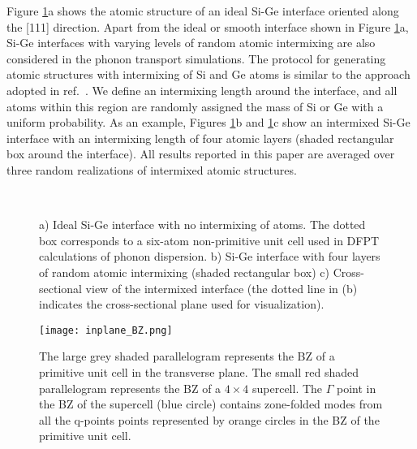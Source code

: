 \documentclass[11pt]{article}
\begin{document}
Figure \ref{Si_Ge_schematic}a shows the atomic structure of an ideal Si-Ge interface oriented along the [111] direction. Apart from the ideal or smooth interface shown in Figure \ref{Si_Ge_schematic}a, Si-Ge interfaces with varying levels of random atomic intermixing are also considered in the phonon transport simulations. The protocol for generating atomic structures with intermixing of Si and Ge atoms is similar to the approach adopted in ref.~\cite{tian2012enhancing}. We define an intermixing length around the interface, and all atoms within this region are randomly assigned the mass of Si or Ge with a uniform probability. As an example, Figures \ref{Si_Ge_schematic}b and \ref{Si_Ge_schematic}c show an intermixed Si-Ge interface with an intermixing length of four atomic layers (shaded rectangular box around the interface). All results reported in this paper are averaged over three random realizations of intermixed atomic structures. 
\begin{figure}
\centering
{}\\
\qquad\quad
{}
\caption{a) Ideal Si-Ge interface with no intermixing of atoms. The dotted box corresponds to a six-atom non-primitive unit cell used in DFPT calculations of phonon dispersion. b) Si-Ge interface with four layers of random atomic intermixing (shaded rectangular box) c) Cross-sectional view of the intermixed interface (the dotted line in (b) indicates the cross-sectional plane used for visualization).}\label{Si_Ge_schematic}
\end{figure}
\begin{figure}
\begin{center}
\texttt{[image: inplane\_BZ.png]}
\caption{The large grey shaded parallelogram represents the BZ of a primitive unit cell in the transverse plane. The small red shaded parallelogram represents the BZ of a $4\times4$ supercell. The $\Gamma$ point in the BZ of the supercell (blue circle) contains zone-folded modes from all the q-points points represented by orange circles in the BZ of the primitive unit cell.}
\label{inplane_BZ}
\end{center}
\end{figure}
\end{document}
